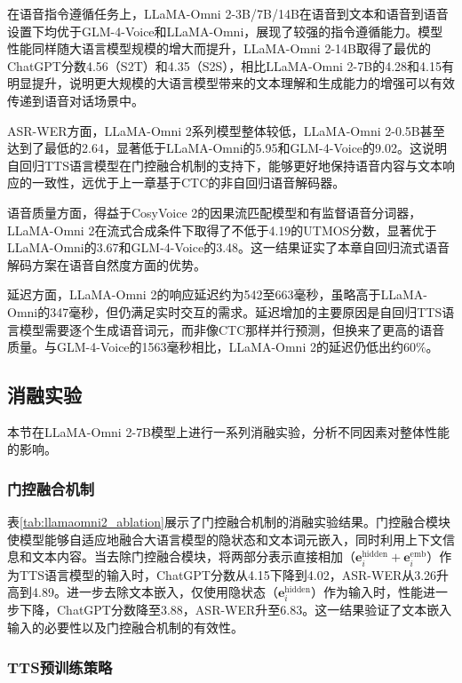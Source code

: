 在语音指令遵循任务上，LLaMA-Omni 2-3B/7B/14B在语音到文本和语音到语音设置下均优于GLM-4-Voice和LLaMA-Omni，展现了较强的指令遵循能力。模型性能同样随大语言模型规模的增大而提升，LLaMA-Omni 2-14B取得了最优的ChatGPT分数4.56（S2T）和4.35（S2S），相比LLaMA-Omni 2-7B的4.28和4.15有明显提升，说明更大规模的大语言模型带来的文本理解和生成能力的增强可以有效传递到语音对话场景中。

ASR-WER方面，LLaMA-Omni 2系列模型整体较低，LLaMA-Omni 2-0.5B甚至达到了最低的2.64，显著低于LLaMA-Omni的5.95和GLM-4-Voice的9.02。这说明自回归TTS语言模型在门控融合机制的支持下，能够更好地保持语音内容与文本响应的一致性，远优于上一章基于CTC的非自回归语音解码器。

语音质量方面，得益于CosyVoice 2的因果流匹配模型和有监督语音分词器，LLaMA-Omni 2在流式合成条件下取得了不低于4.19的UTMOS分数，显著优于LLaMA-Omni的3.67和GLM-4-Voice的3.48。这一结果证实了本章自回归流式语音解码方案在语音自然度方面的优势。

延迟方面，LLaMA-Omni 2的响应延迟约为542至663毫秒，虽略高于LLaMA-Omni的347毫秒，但仍满足实时交互的需求。延迟增加的主要原因是自回归TTS语言模型需要逐个生成语音词元，而非像CTC那样并行预测，但换来了更高的语音质量。与GLM-4-Voice的1563毫秒相比，LLaMA-Omni 2的延迟仍低出约60\%。

\subsection{消融实验}

本节在LLaMA-Omni 2-7B模型上进行一系列消融实验，分析不同因素对整体性能的影响。

\subsubsection{门控融合机制}



表\ref{tab:llamaomni2_ablation}展示了门控融合机制的消融实验结果。门控融合模块使模型能够自适应地融合大语言模型的隐状态和文本词元嵌入，同时利用上下文信息和文本内容。当去除门控融合模块，将两部分表示直接相加（$\mathbf{e}_i^\text{hidden} + \mathbf{e}_i^\text{emb}$）作为TTS语言模型的输入时，ChatGPT分数从4.15下降到4.02，ASR-WER从3.26升高到4.89。进一步去除文本嵌入，仅使用隐状态（$\mathbf{e}_i^\text{hidden}$）作为输入时，性能进一步下降，ChatGPT分数降至3.88，ASR-WER升至6.83。这一结果验证了文本嵌入输入的必要性以及门控融合机制的有效性。

\subsubsection{TTS预训练策略}

